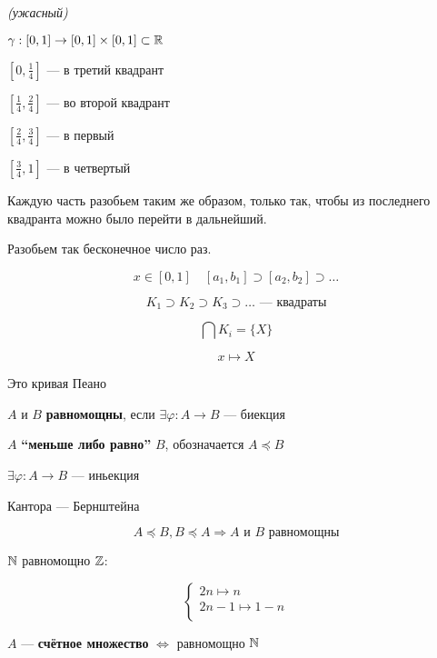    \begin{example}
        \textit{(ужасный)}

        $\gamma: [0,1]\to [0,1]\times[0,1]\subset\operatorname*{\mathbb{R}}$

        $[0, \frac{1}{4}]$ --- в третий квадрант

        $[\frac{1}{4}, \frac{2}{4}]$ --- во второй квадрант

        $[\frac{2}{4}, \frac{3}{4}]$ --- в первый

        $[\frac{3}{4}, 1]$ --- в четвертый
        
        Каждую часть разобьем таким же образом, только так, чтобы из последнего квадранта можно было перейти в дальнейший.

        Разобьем так бесконечное число раз.

        $$x\in [0,1] \quad [a_1, b_1]\supset[a_2, b_2]\supset\ldots$$

        $$K_1\supset K_2\supset K_3\supset\ldots \text{ --- квадраты}$$

        $$\bigcap K_i=\{X\}$$

        $$x\mapsto X$$

        Это кривая Пеано
    \end{example}
    \begin{definition}
        $A$ и $B$ \textbf{равномощны}, если $\exists \varphi: A\to B$ --- биекция
    \end{definition}
    \begin{definition}
        $A$ \textbf{``меньше либо равно''} $B$, обозначается $A\preccurlyeq B$

        $\exists \varphi : A\to B$ --- иньекция
    \end{definition}
    \begin{theorem}
        Кантора --- Бернштейна

        $$A\preccurlyeq B, B\preccurlyeq A \Rightarrow A \text{ и } B \text{ равномощны}$$
    \end{theorem}

    $\operatorname*{\mathbb{N}}$ равномощно $\operatorname*{\mathbb{Z}}$:

    $$\begin{cases}
        2n\mapsto n\\
    2n-1\mapsto 1-n\\
    \end{cases}$$

    \begin{definition}
        $A$ --- \textbf{счётное множество} $\Leftrightarrow$ равномощно $\operatorname*{\mathbb{N}}$
    \end{definition}


